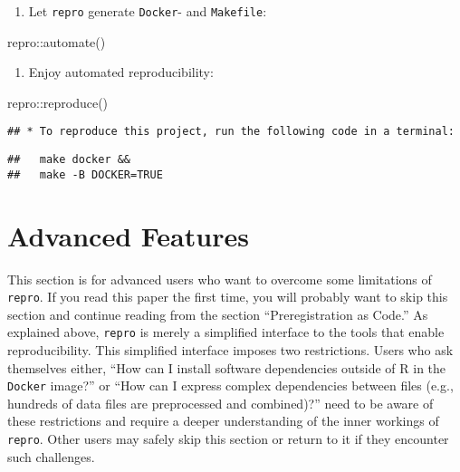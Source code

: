 \documentclass[psych,tutorial,accept,moreauthors,pdftex]{Definitions/mdpi}
\newenvironment{Shaded}{\begin{snugshade}}{\end{snugshade}}
\newcommand{\FunctionTok}[1]{\textcolor[rgb]{0.00,0.00,0.00}{#1}}
\newcommand{\NormalTok}[1]{#1}
\newcommand{\SpecialCharTok}[1]{\textcolor[rgb]{0.00,0.00,0.00}{#1}}
\begin{document}
\begin{paracol}{2}
\begin{enumerate}
\def\labelenumi{\arabic{enumi}.}
\setcounter{enumi}{3}
\item
  Let \texttt{repro} generate \texttt{Docker}- and \texttt{Makefile}:
\end{enumerate}


\begin{adjustwidth}{0.5cm}{0cm} 
\begin{Shaded}
\begin{Highlighting}[]
\NormalTok{repro}\SpecialCharTok{::}\FunctionTok{automate}\NormalTok{()}
\end{Highlighting}
\end{Shaded}
\end{adjustwidth}

\begin{enumerate}
\def\labelenumi{\arabic{enumi}.}
\setcounter{enumi}{4}
\item
  Enjoy automated reproducibility:
\end{enumerate}


\begin{adjustwidth}{0.5cm}{0cm} 
\begin{Shaded}
\begin{Highlighting}[]
\NormalTok{repro}\SpecialCharTok{::}\FunctionTok{reproduce}\NormalTok{()}
\end{Highlighting}
\end{Shaded}

\begin{verbatim}
## * To reproduce this project, run the following code in a terminal:
\end{verbatim}

\begin{verbatim}
##   make docker &&
##   make -B DOCKER=TRUE
\end{verbatim}
\end{adjustwidth}

\section{Advanced Features}\label{advanced-features}

This section is for advanced users who want to overcome some limitations
of \texttt{repro}. If you read this paper the first time, you will
probably want to skip this section and continue reading from the section
``Preregistration as Code.'' As explained above, \texttt{repro} is
merely a simplified interface to the tools that enable reproducibility.
This simplified interface imposes two restrictions. Users who ask
themselves either, ``How can I install software dependencies outside of
R in the \texttt{Docker} image?'' or ``How can I express complex
dependencies between files (e.g., hundreds of data files are
preprocessed and combined)?'' need to be aware of these restrictions and
require a deeper understanding of the inner workings of \texttt{repro}.
Other users may safely skip this section or return to it if they
encounter such challenges.


\end{paracol}
\end{document}
